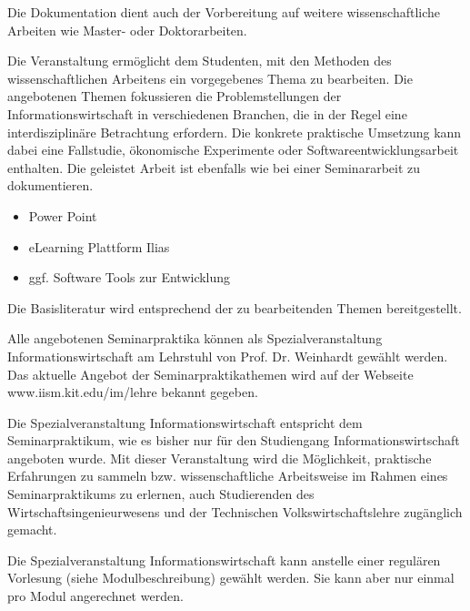 \begin{course}
\begin{learningoutcomes}
 

Die Dokumentation dient auch der Vorbereitung auf weitere wissenschaftliche Arbeiten wie Master- oder Doktorarbeiten.


\end{learningoutcomes}

\begin{content}
Die Veranstaltung ermöglicht dem Studenten, mit den Methoden des wissenschaftlichen Arbeitens ein vorgegebenes Thema zu bearbeiten. Die angebotenen Themen fokussieren die Problemstellungen der Informationswirtschaft in verschiedenen Branchen, die in der Regel eine interdisziplinäre Betrachtung erfordern. Die konkrete praktische Umsetzung kann dabei eine Fallstudie, ökonomische Experimente oder Softwareentwicklungsarbeit enthalten. Die geleistet Arbeit ist ebenfalls wie bei einer Seminararbeit zu dokumentieren.


\end{content}

\begin{media}\begin{itemize}\item Power Point  \item eLearning Plattform Ilias  \item ggf. Software Tools zur Entwicklung  \end{itemize}\end{media}

\begin{literature}Die Basisliteratur wird entsprechend der zu bearbeitenden Themen bereitgestellt.

\end{literature}

\begin{remarks}Alle angebotenen Seminarpraktika können als Spezialveranstaltung Informationswirtschaft am Lehrstuhl von Prof. Dr. Weinhardt gewählt werden. Das aktuelle Angebot der Seminarpraktikathemen wird auf der Webseite www.iism.kit.edu/im/lehre bekannt gegeben.

 

Die Spezialveranstaltung Informationswirtschaft entspricht dem Seminarpraktikum, wie es bisher nur für den Studiengang Informationswirtschaft angeboten wurde. Mit dieser Veranstaltung wird die Möglichkeit, praktische Erfahrungen zu sammeln bzw. wissenschaftliche Arbeitsweise im Rahmen eines Seminarpraktikums zu erlernen, auch Studierenden des Wirtschaftsingenieurwesens und der Technischen Volkswirtschaftslehre zugänglich gemacht.

 

Die Spezialveranstaltung Informationswirtschaft kann anstelle einer regulären Vorlesung (siehe Modulbeschreibung) gewählt werden. Sie kann aber nur einmal pro Modul angerechnet werden.

 \end{remarks}

\end{course}